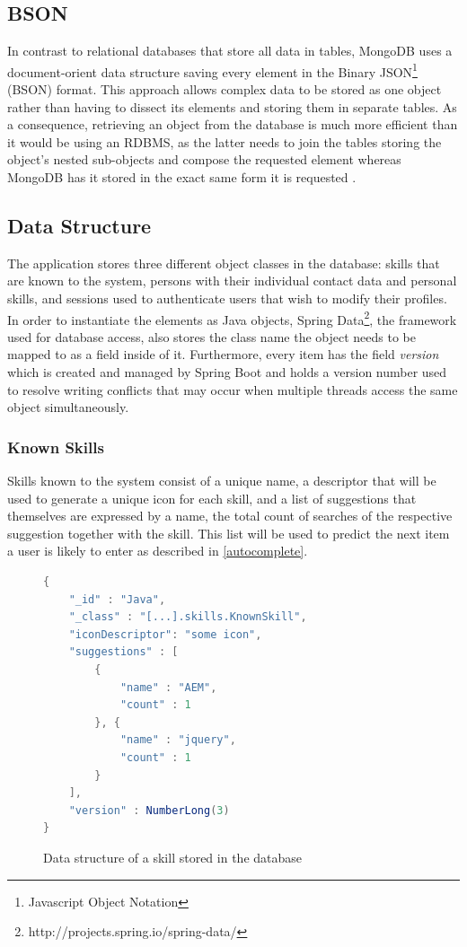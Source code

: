 \subsection{BSON}
\label{BSON}
In contrast to relational databases that store all data in tables, MongoDB uses a document-orient data structure saving every element in the Binary JSON\footnote{Javascript Object Notation} (BSON) format. This approach allows complex data to be stored as one object rather than having to dissect its elements and storing them in separate tables. As a consequence, retrieving an object from the database is much more efficient than it would be using an RDBMS, as the latter needs to join the tables storing the object's nested sub-objects and compose the requested element whereas MongoDB has it stored in the exact same form it is requested \cite[p. 10]{MongoGuide}.

\subsection{Data Structure}
The application stores three different object classes in the database: skills that are known to the system, persons with their individual contact data and personal skills, and sessions used to authenticate users that wish to modify their profiles. In order to instantiate the elements as Java objects, Spring Data\footnote{http://projects.spring.io/spring-data/}, the framework used for database access, also stores the class name the object needs to be mapped to as a field inside of it. Furthermore, every item has the field \textit{version} which is created and managed by Spring Boot and holds a version number used to resolve writing conflicts that may occur when multiple threads access the same object simultaneously.

\newpage
\subsubsection{Known Skills}
Skills known to the system consist of a unique name, a descriptor that will be used to generate a unique icon for each skill, and a list of suggestions that themselves are expressed by a name, the total count of searches of the respective suggestion together with the skill. This list will be used to predict the next item a user is likely to enter as described in \ref{autocomplete}.
\begin{figure}[h]
\begin{lstlisting}[language=Java]
{
	"_id" : "Java",
	"_class" : "[...].skills.KnownSkill",
	"iconDescriptor": "some icon",
	"suggestions" : [
		{
			"name" : "AEM",
			"count" : 1
		}, {
			"name" : "jquery",
			"count" : 1
		}
	],
	"version" : NumberLong(3)
}
\end{lstlisting}
\caption[Data Structure: Skill]{Data structure of a skill stored in the database}
\end{figure}

